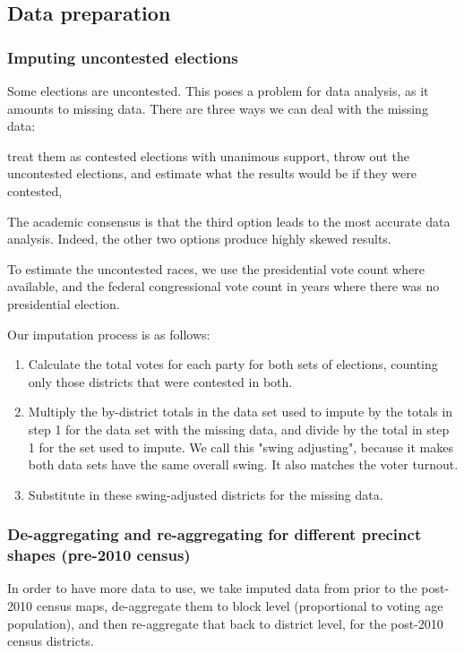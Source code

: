 \documentclass[preprint,12pt]{article}
\begin{document}
\subsection{Data preparation}
\subsubsection{Imputing uncontested elections}
 
Some elections are uncontested.   This poses a problem for data analysis, as it amounts to missing data.  There are three ways we can deal with the missing data: 
 
treat them as contested elections with unanimous support, 
throw out the uncontested elections, and 
estimate what the results would be if they were contested, 
 
The academic consensus is that the third option leads to the most accurate data analysis.  Indeed, the other two options produce highly skewed results.
 
To estimate the uncontested races, we use the presidential vote count where available, and the federal congressional vote count in years where there was no presidential election.
 
Our imputation process is as follows:
 
\begin{enumerate}
\item Calculate the total votes for each party for both sets of elections, counting only those districts that were contested in both.
\item Multiply the by-district totals in the data set used to impute by the totals in step 1 for the data set with the missing data, and divide by the total in step 1 for the set used to impute.  We call this "swing adjusting", because it makes both data sets have the same overall swing.  It also matches the voter turnout.
\item Substitute in these swing-adjusted districts for the missing data.
\end{enumerate}
 
\subsubsection{De-aggregating and re-aggregating for different precinct shapes (pre-2010 census)}
 
In order to have more data to use, we take imputed data from prior to the post-2010 census maps, de-aggregate them to block level (proportional to voting age population), and then re-aggregate that back to district level, for the post-2010 census districts.
 
\end{document}
